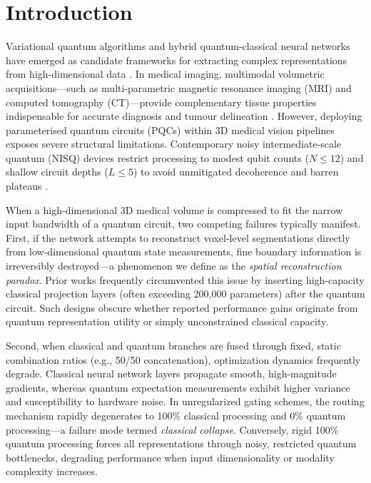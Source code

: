 \section{Introduction}
\label{sec:introduction}

Variational quantum algorithms and hybrid quantum-classical neural networks have emerged as candidate frameworks for extracting complex representations from high-dimensional data \cite{cerezo2021variational,schuld2021machine}. 
In medical imaging, multimodal volumetric acquisitions---such as multi-parametric magnetic resonance imaging (MRI) and computed tomography (CT)---provide complementary tissue properties indispensable for accurate diagnosis and tumour delineation \cite{menze2014multimodal,thummerer2023synthrad2023}. 
However, deploying parameterised quantum circuits (PQCs) within 3D medical vision pipelines exposes severe structural limitations. 
Contemporary noisy intermediate-scale quantum (NISQ) devices restrict processing to modest qubit counts ($N \le 12$) and shallow circuit depths ($L \le 5$) to avoid unmitigated decoherence and barren plateaus \cite{preskill2018quantum,mcclean2018barren,wang2021noise}.

When a high-dimensional 3D medical volume is compressed to fit the narrow input bandwidth of a quantum circuit, two competing failures typically manifest. 
First, if the network attempts to reconstruct voxel-level segmentations directly from low-dimensional quantum state measurements, fine boundary information is irreversibly destroyed---a phenomenon we define as the \textit{spatial reconstruction paradox}. 
Prior works frequently circumvented this issue by inserting high-capacity classical projection layers (often exceeding 200,000 parameters) after the quantum circuit. 
Such designs obscure whether reported performance gains originate from quantum representation utility or simply unconstrained classical capacity.

Second, when classical and quantum branches are fused through fixed, static combination ratios (e.g., 50/50 concatenation), optimization dynamics frequently degrade. 
Classical neural network layers propagate smooth, high-magnitude gradients, whereas quantum expectation measurements exhibit higher variance and susceptibility to hardware noise. 
In unregularized gating schemes, the routing mechanism rapidly degenerates to 100\% classical processing and 0\% quantum processing---a failure mode termed \textit{classical collapse}. 
Conversely, rigid 100\% quantum processing forces all representations through noisy, restricted quantum bottlenecks, degrading performance when input dimensionality or modality complexity increases.

